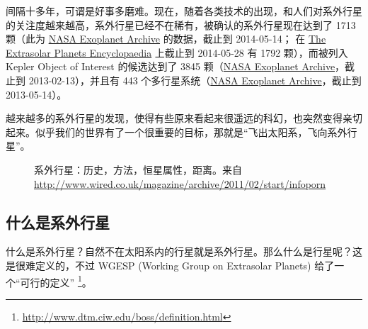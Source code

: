 \documentclass[letterpaper,10pt,english]{sphinxmanual}
\begin{document}
间隔十多年，可谓是好事多磨难。现在，随着各类技术的出现，和人们对系外行星的关注度越来越高，系外行星已经不在稀有，被确认的系外行星现在达到了 1713 颗（此为 \href{http://exoplanetarchive.ipac.caltech.edu/index.html}{NASA Exoplanet Archive} 的数据，截止到 2014-05-14； 在 \href{http://exoplanet.eu/}{The Extrasolar Planets Encyclopaedia} 上截止到 2014-05-28 有 1792 颗），而被列入 Kepler Object of Interest 的候选达到了 3845 颗（\href{http://exoplanetarchive.ipac.caltech.edu/index.html}{NASA Exoplanet Archive}，截止到 2013-02-13），并且有 443 个多行星系统（\href{http://exoplanetarchive.ipac.caltech.edu/index.html}{NASA Exoplanet Archive}，截止到 2013-05-14）。

越来越多的系外行星的发现，使得有些原来看起来很遥远的科幻，也突然变得亲切起来。似乎我们的世界有了一个很重要的目标，那就是“飞出太阳系，飞向系外行星”。
\begin{figure}[htbp]
\centering
\capstart

\caption{系外行星：历史，方法，恒星属性，距离。来自 \href{http://www.wired.co.uk/magazine/archive/2011/02/start/infoporn}{http://www.wired.co.uk/magazine/archive/2011/02/start/infoporn}}\end{figure}


\subsection{什么是系外行星}
\label{intro:id6}
什么是系外行星？自然不在太阳系内的行星就是系外行星。那么什么是行星呢？这是很难定义的，不过 WGESP (Working Group on Extrasolar Planets) 给了一个“可行的定义” \footnote{
\href{http://www.dtm.ciw.edu/boss/definition.html}{http://www.dtm.ciw.edu/boss/definition.html}
}。
\end{document}
